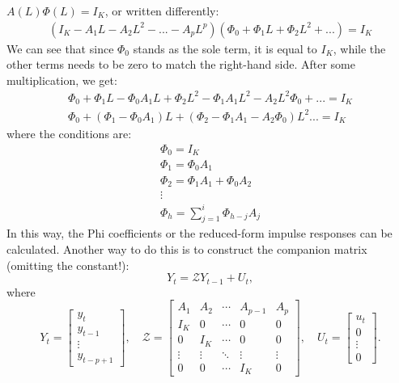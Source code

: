 \documentclass[a4paper, 12pt]{article}
\begin{document}
$A(L)\Phi(L)=I_K$, or written differently:
\begin{equation}
\begin{aligned}
(I_K-A_1 L- A_2L^2-...-A_pL^p)(\Phi_0+\Phi_1L+\Phi_2L^2+...)=I_K \nonumber
\end{aligned}
\end{equation} 
We can see that since $\Phi_0$ stands as the sole term, it is equal to $I_K$, while the other terms needs to be zero to match the right-hand side.
After some multiplication, we get:
\begin{equation}
\begin{aligned}
\Phi_0+\Phi_1L-\Phi_0A_1L+\Phi_2 L^2-\Phi_1 A_1 L^2-A_2 L^2\Phi_0+...=I_K \nonumber \\
\Phi_0+(\Phi_1-\Phi_0A_1)L+(\Phi_2-\Phi_1 A_1-A_2\Phi_0)L^2...=I_K
\end{aligned}
\end{equation} 
where the conditions are:
\begin{equation}
\begin{aligned}
\Phi_0=I_K \nonumber \\
\Phi_1=\Phi_0 A_1 \\
\Phi_2=\Phi_1 A_1+\Phi_0A_2\\
\vdots \\
\Phi_h=\sum_{j=1}^i\Phi_{h-j}A_j
\end{aligned}
\end{equation}
In this way, the Phi coefficients or the reduced-form impulse responses can be calculated. Another way to do this is to construct the companion matrix (omitting the constant!):
\[
Y_t = \mathcal{Z} Y_{t-1} + U_t,
\]
\noindent where
\[
Y_t =
\begin{bmatrix}
y_t \\
y_{t-1} \\
\vdots \\
y_{t-p+1}
\end{bmatrix},
\quad
\mathcal{Z} =
\begin{bmatrix}
A_1 & A_2 & \cdots & A_{p-1} & A_p \\
I_K & 0   & \cdots & 0       & 0   \\
0   & I_K & \cdots & 0       & 0   \\
\vdots & \vdots & \ddots & \vdots  & \vdots \\
0   & 0   & \cdots & I_K     & 0
\end{bmatrix},
\quad
U_t =
\begin{bmatrix}
u_t \\
0 \\
\vdots \\
0
\end{bmatrix}.
\]
\end{document}
